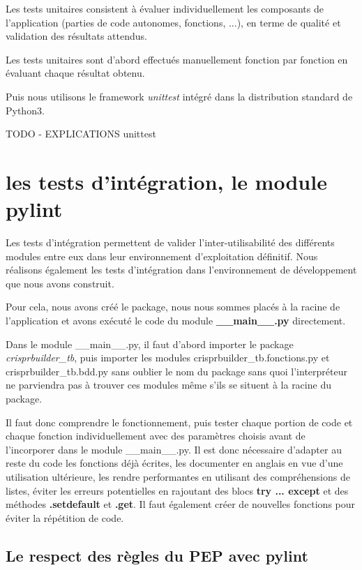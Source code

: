 \documentclass[twoside,a4paper,11pt,frenchb,openany]{report}
\begin{document}
Les tests unitaires consistent à évaluer individuellement les composants de l'application (parties de code autonomes, fonctions, ...), en terme de qualité et validation des résultats attendus.

Les tests unitaires sont d'abord effectués manuellement fonction par fonction en évaluant chaque résultat obtenu.

Puis nous utilisons le framework \textit{unittest} intégré dans la distribution standard de Python3.

TODO - EXPLICATIONS unittest





\section{les tests d'intégration, le module pylint}

Les tests d'intégration permettent de valider l'inter-utilisabilité des différents modules entre eux dans leur environnement d'exploitation définitif. Nous réalisons également les tests d'intégration dans l'environnement de développement que nous avons construit.

Pour cela, nous avons créé le package, nous nous sommes placés à la racine de l'application et avons exécuté le code du module \textbf{\_\_main\_\_.py} directement.

Dans le module \_\_main\_\_.py, il faut d'abord importer le package \textit{crisprbuilder\_tb}, puis importer les modules crisprbuilder\_tb.fonctions.py et crisprbuilder\_tb.bdd.py sans oublier le nom du package sans quoi l'interpréteur ne parviendra pas à trouver ces modules même s'ils se situent à la racine du package.  


Il faut donc comprendre le fonctionnement, puis tester chaque portion de code et chaque fonction individuellement avec des paramètres choisis avant de l'incorporer dans le module \_\_main\_\_.py. Il est donc nécessaire d'adapter au reste du code les fonctions déjà écrites, les documenter en anglais en vue d'une utilisation ultérieure, les rendre performantes en utilisant des compréhensions de listes, éviter les erreurs potentielles en rajoutant des blocs \textbf{try ... except} et des méthodes \textbf{.setdefault} et \textbf{.get}. Il faut également créer de nouvelles fonctions pour éviter la répétition de code.

\subsection{Le respect des règles du PEP avec pylint}
\end{document}
